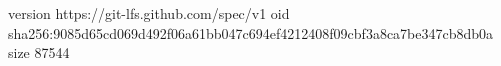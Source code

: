 version https://git-lfs.github.com/spec/v1
oid sha256:9085d65cd069d492f06a61bb047c694ef4212408f09cbf3a8ca7be347cb8db0a
size 87544
